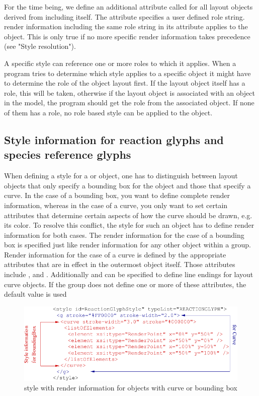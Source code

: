 For the time being, we define an additional attribute called  for all 
layout objects derived from \GraphicalObject including \GraphicalObject itself.
The attribute specifies a user defined role string. render information including the same role string in its
 attribute applies to the object. This is only true if no more specific render information
takes precedence (see "Style resolution").
 
A specific style can reference one or more roles to which it applies. When a program tries to determine which style applies to a 
specific object it might have to determine the role of the object layout first. If the 
layout object itself has a role, this will be taken, otherwise if the layout object 
is associated with an object in the model, the program should get the role from 
the associated object. If none of them has a role, no role based style can be 
applied to the object.

\subsection{Style information for reaction glyphs and species reference glyphs}

When defining a style for a  or  object, one 
has to distinguish between layout objects that only specify a bounding box for the 
object and those that specify a curve. In the case of a bounding box, you want to 
define complete render information, whereas in the case of a curve, you only 
want to set certain attributes that determine certain aspects of how the 
curve should be drawn, e.g. its color. To resolve this conflict, the style for such an 
object has to define render information for both cases. The render information 
for the case of a bounding box is specified just like render information for 
any other object within a group. Render information for the case of a curve is 
defined by the appropriate attributes that are in effect in the outermost \RenderGroup 
object itself. Those attributes include ,  
and . Additionally  and  can be 
specified to define line endings for layout curve objects. If the group does not define 
one or more of these attributes, the default value is used

\begin{figure}[!ht]
\begin{center}
\includegraphics[scale=0.25]{figures/CurveAndBBStyle}
\end{center}
\caption{style with render information for objects with curve or bounding box}
\label{CurveAndBBStyle}
\end{figure}

